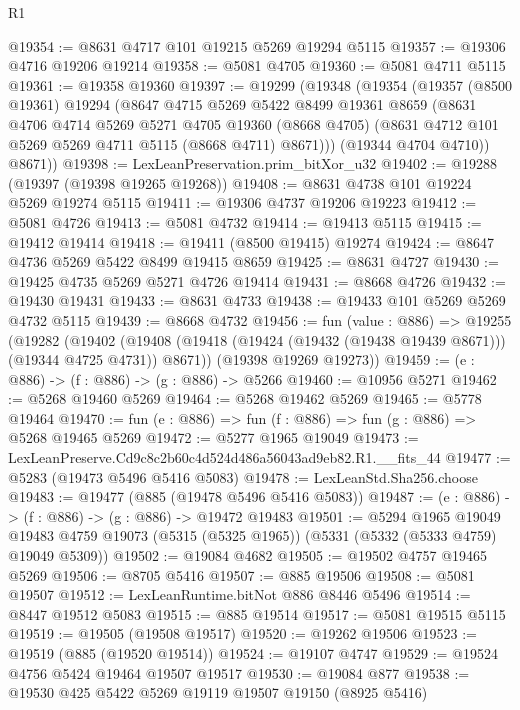 \begin{lexlean}{R1}
\begin{coremodule}
@19354 := @8631 @4717 @101 @19215 @5269 @19294 @5115
@19357 := @19306 @4716 @19206 @19214
@19358 := @5081 @4705
@19360 := @5081 @4711 @5115
@19361 := @19358 @19360
@19397 := @19299
    (@19348
      (@19354
        (@19357
          (@8500 @19361)
          @19294
          (@8647
            @4715
            @5269
            @5422
            @8499
            @19361
            @8659
            (@8631
              @4706
              @4714
              @5269
              @5271
              @4705
              @19360
              (@8668 @4705)
              (@8631 @4712 @101 @5269 @5269 @4711 @5115 (@8668 @4711) @8671)))
          (@19344 @4704 @4710))
        @8671))
@19398 := LexLeanPreservation.prim_bitXor_u32
@19402 := @19288 (@19397 (@19398 @19265 @19268))
@19408 := @8631 @4738 @101 @19224 @5269 @19274 @5115
@19411 := @19306 @4737 @19206 @19223
@19412 := @5081 @4726
@19413 := @5081 @4732
@19414 := @19413 @5115
@19415 := @19412 @19414
@19418 := @19411 (@8500 @19415) @19274
@19424 := @8647 @4736 @5269 @5422 @8499 @19415 @8659
@19425 := @8631 @4727
@19430 := @19425 @4735 @5269 @5271 @4726 @19414
@19431 := @8668 @4726
@19432 := @19430 @19431
@19433 := @8631 @4733
@19438 := @19433 @101 @5269 @5269 @4732 @5115
@19439 := @8668 @4732
@19456 := fun (value : @886) =>
  @19255
    (@19282
      (@19402 (@19408 (@19418 (@19424 (@19432 (@19438 @19439 @8671))) (@19344 @4725 @4731)) @8671))
      (@19398 @19269 @19273))
@19459 := (e : @886) -> (f : @886) -> (g : @886) -> @5266
@19460 := @10956 @5271
@19462 := @5268 @19460 @5269
@19464 := @5268 @19462 @5269
@19465 := @5778 @19464
@19470 := fun (e : @886) => fun (f : @886) => fun (g : @886) => @5268 @19465 @5269
@19472 := @5277 @1965 @19049
@19473 := LexLeanPreserve.Cd9c8c2b60c4d524d486a56043ad9eb82.R1.__fits_44
@19477 := @5283 (@19473 @5496 @5416 @5083)
@19478 := LexLeanStd.Sha256.choose
@19483 := @19477 (@885 (@19478 @5496 @5416 @5083))
@19487 := (e : @886) -> (f : @886) -> (g : @886) -> @19472 @19483
@19501 := @5294
    @1965
    @19049
    @19483
    @4759
    @19073
    (@5315 (@5325 @1965))
    (@5331 (@5332 (@5333 @4759) @19049 @5309))
@19502 := @19084 @4682
@19505 := @19502 @4757 @19465 @5269
@19506 := @8705 @5416
@19507 := @885 @19506
@19508 := @5081 @19507
@19512 := LexLeanRuntime.bitNot @886 @8446 @5496
@19514 := @8447 @19512 @5083
@19515 := @885 @19514
@19517 := @5081 @19515 @5115
@19519 := @19505 (@19508 @19517)
@19520 := @19262 @19506
@19523 := @19519 (@885 (@19520 @19514))
@19524 := @19107 @4747
@19529 := @19524 @4756 @5424 @19464 @19507 @19517
@19530 := @19084 @877
@19538 := @19530 @425 @5422 @5269 @19119 @19507 @19150 (@8925 @5416)

\end{coremodule}
\end{lexlean}
